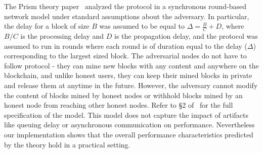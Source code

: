\smallskip
{} The Prism theory paper~\cite{prism-theory} analyzed the protocol in a synchronous round-based network model under standard assumptions about the adversary. In particular, the delay for a block of size $B$ was assumed to be equal to $\Delta = \frac{B}{C}+D$, where $B/C$ is the processing delay and $D$ is the propagation delay, and the protocol was assumed to run in rounds where each round is of duration equal to the delay ($\Delta$) corresponding to the largest sized block. The adversarial nodes do not have to follow protocol - they can mine new blocks with any content and anywhere on the blockchain, and  unlike honest users, they can keep their mined blocks in private and release them at anytime in the future. However, the adversary cannot modify the content of blocks mined by honest nodes or withhold blocks mined by an honest node from reaching other honest nodes. Refer to \S2 of~\cite{prism-theory} for the full specification of the model. This model does not capture the impact of artifacts like queuing delay or asynchronous communication on performance. Nevertheless our implementation shows that the overall performance characteristics predicted by the theory hold in a practical setting. 









